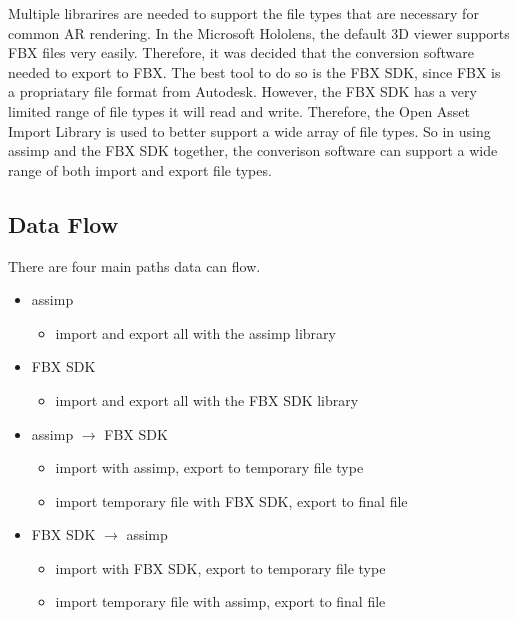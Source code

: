     Multiple librarires are needed to support the file types that are necessary for common AR rendering.  In the Microsoft Hololens, the default
    3D viewer supports FBX files very easily.  Therefore, it was decided that the conversion software needed to export to FBX.  The best tool to do 
    so is the FBX SDK, since FBX is a propriatary file format from Autodesk.  However, the FBX SDK has a very limited range of file types it will read and write.
    Therefore, the Open Asset Import Library is used to better support a wide array of file types.  So in using assimp and the FBX SDK together,
    the converison software can support a wide range of both import and export file types.

    \subsection{Data Flow}
        There are four main paths data can flow.
        \begin{itemize}
            \item assimp
            \begin{itemize}
                \item import and export all with the assimp library
            \end{itemize}
            
            \item FBX SDK
            \begin{itemize}
                \item import and export all with the FBX SDK library
            \end{itemize}

            \item assimp $\rightarrow$ FBX SDK
            \begin{itemize}
                \item import with assimp, export to temporary file type
                \item import temporary file with FBX SDK, export to final file 
            \end{itemize}

            \item FBX SDK $\rightarrow$ assimp
            \begin{itemize}
                \item import with FBX SDK, export to temporary file type
                \item import temporary file with assimp, export to final file 
            \end{itemize}
        \end{itemize}
        
